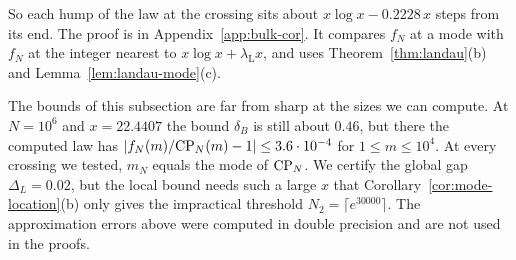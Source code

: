 So each hump of the law at the crossing sits about
$x\log x-0.2228\,x$ steps from its end. The proof is in
Appendix~\ref{app:bulk-cor}. It compares $f_N$ at a mode with $f_N$ at the
integer nearest to $x\log x+\lambda_{\mathrm L}x$, and uses
Theorem~\ref{thm:landau}(b) and Lemma~\ref{lem:landau-mode}(c).

\begin{remark}\label{rem:bulk}
The bounds of this subsection are far from sharp at the sizes we can
compute. At $N=10^6$ and $x=22.4407$ the bound $\delta_B$ is still about
$0.46$, but there the computed law has
$\lvert f_N(m)/\mathrm{CP}_N(m)-1\rvert\le3.6\cdot10^{-4}$ for $1\le m\le10^4$. At
every crossing we tested, $m_N$ equals the mode of $\mathrm{CP}_N$.
We certify the global gap $\Delta_L=0.02$, but the local bound needs
such a large $x$ that Corollary~\ref{cor:mode-location}(b) only gives
the impractical threshold $N_2=\lceil e^{30000}\rceil$.
The approximation errors above were computed in double precision and
are not used in the proofs.
\end{remark}
